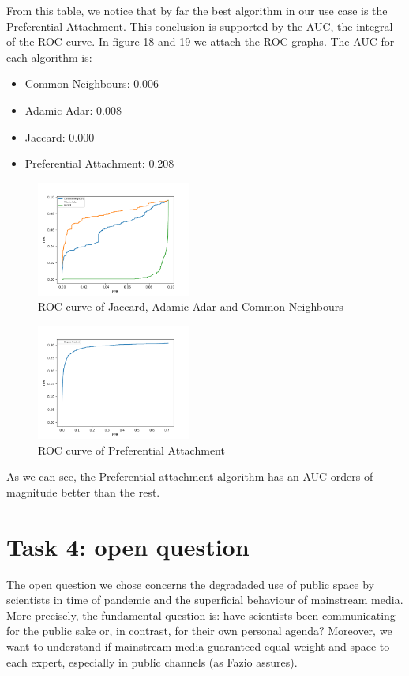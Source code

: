 \documentclass[sigchi]{acmart}
\begin{document}
From this table, we notice that by far the best algorithm in our use case is the Preferential Attachment. This conclusion is supported by the AUC, the integral of the ROC curve. In figure 18 and 19 we attach the ROC graphs. The AUC for each algorithm is:
\begin{itemize}
    \item Common Neighbours: 	 0.006
\item Adamic Adar: 	 0.008
\item Jaccard: 	 0.000
\item Preferential Attachment: 	 0.208
\end{itemize}
\begin{figure}[!htbp]
    \centering
    \includegraphics[width=0.45\textwidth]{img/linkPred/firstgraph.png}
    \caption{ROC curve of Jaccard, Adamic Adar and Common Neighbours}
    \label{fig:my_label}
\end{figure}

\begin{figure}[!htbp]
    \centering
    \includegraphics[width=0.45\textwidth]{img/linkPred/secondgraph.png}
    \caption{ROC curve of Preferential Attachment}
    \label{fig:my_label}
\end{figure}
As we can see, the Preferential attachment algorithm has an AUC orders of magnitude better than the rest.

\section{Task 4: open question}

The open question we chose concerns the degradaded use of public space by scientists in time of pandemic and the superficial behaviour of mainstream media. More precisely, the fundamental question is: have scientists been communicating for the public sake or, in contrast, for their own personal agenda? Moreover, we want to understand if mainstream media guaranteed equal weight and space to each expert, especially in public channels (as Fazio assures).
\end{document}
